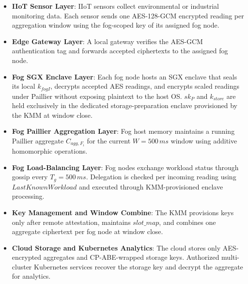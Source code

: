 \documentclass[conference]{IEEEtran}
\begin{document}
    \begin{itemize}
        \item \textbf{IIoT Sensor Layer}: IIoT sensors collect environmental or industrial monitoring data. Each sensor sends one AES-128-GCM encrypted reading per aggregation window using the fog-scoped key of its assigned fog node.
        \item \textbf{Edge Gateway Layer}: A local gateway verifies the AES-GCM authentication tag and forwards accepted ciphertexts to the assigned fog node.
        \item \textbf{Fog SGX Enclave Layer}: Each fog node hosts an SGX enclave that seals its local $k_{fogI}$, decrypts accepted AES readings, and encrypts scaled readings under Paillier without exposing plaintext to the host OS. $sk_P$ and $k_{store}$ are held exclusively in the dedicated storage-preparation enclave provisioned by the KMM at window close.
        \item \textbf{Fog Paillier Aggregation Layer}: Fog host memory maintains a running Paillier aggregate $C_{agg,F_i}$ for the current $W=500\,ms$ window using additive homomorphic operations.
        \item \textbf{Fog Load-Balancing Layer}: Fog nodes exchange workload status through gossip every $T_g=500\,ms$. Delegation is checked per incoming reading using $LastKnownWorkload$ and executed through KMM-provisioned enclave processing.
        \item \textbf{Key Management and Window Combine}: The KMM provisions keys only after remote attestation, maintains $slot\_map$, and combines one aggregate ciphertext per fog node at window close.
        \item \textbf{Cloud Storage and Kubernetes Analytics}: The cloud stores only AES-encrypted aggregates and CP-ABE-wrapped storage keys. Authorized multi-cluster Kubernetes services recover the storage key and decrypt the aggregate for analytics.
    \end{itemize}
\end{document}
